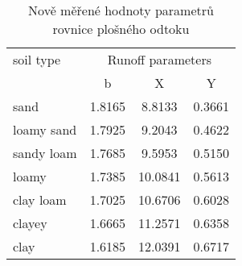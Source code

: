 \begin{table}[b!]
  \centering
  \caption{{Nově měřené hodnoty parametrů rovnice plošného odtoku \citep{Neumann15:232823}}}
    \begin{tabular}{lccc}
    \hline 
      soil type &     \multicolumn{3}{c}{Runoff parameters}\\
     & \multicolumn{1}{c}{b} & \multicolumn{1}{c}{X} & \multicolumn{1}{c}{Y} \\
	\hline    \hline    
    sand  & 1.8165 & 8.8133 & 0.3661 \\
    loamy sand & 1.7925 & 9.2043 & 0.4622 \\
    sandy loam & 1.7685 & 9.5953 & 0.5150 \\
    loamy & 1.7385 & 10.0841 & 0.5613 \\
    clay loam & 1.7025 & 10.6706 & 0.6028 \\
    clayey & 1.6665 & 11.2571 & 0.6358 \\
    clay  & 1.6185 & 12.0391 & 0.6717 \\
    \hline  
    \end{tabular}%
  \label{tab:Neuman_param}%
\end{table}%

